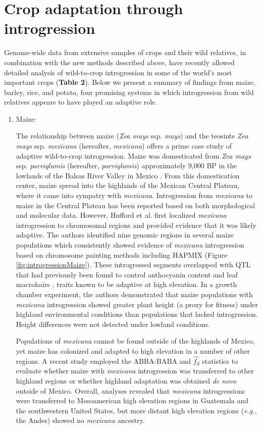 \documentclass[11pt]{article}
\begin{document}
\section*{Crop adaptation through introgression}

Genome-wide data from extensive samples of crops and their wild relatives, in combination with the new methods described above, have recently allowed detailed analysis of wild-to-crop introgression in some of the world's most important crops (\textbf{Table 2}).
Below we present a summary of findings from maize, barley, rice, and potato, four promising systems in which introgression from wild relatives appears to have played an adaptive role.

\begin{enumerate}
\item{Maize:}

The relationship between maize (\emph{Zea mays} ssp. \emph{mays}) and the teosinte \emph{Zea mays} ssp. \emph{mexicana} (hereafter, \emph{mexicana}) offers a prime case study of adaptive wild-to-crop introgression.
Maize was domesticated from \emph{Zea mays} ssp. \emph{parviglumis} (hereafter, \emph{parviglumis})  approximately 9,000 BP in the lowlands of the Balsas River Valley in Mexico \cite{matsuoka2002single}.
From this domestication center, maize spread into the highlands of the Mexican Central Plateau, where it came into sympatry with \emph{mexicana}.
Introgression from \emph{mexicana} to maize in the Central Plateau has been reported based on both morphological \cite {wilkes1977} and molecular \cite{vanHeerwaarden2011, doebley1987} data.
However, Hufford et al. \cite{Hufford2013} first localized \emph{mexicana} introgression to chromosomal regions and provided evidence that it was likely adaptive.
The authors identified nine genomic regions in several maize populations which consistently showed evidence of \emph{mexicana} introgression based on chromosome painting methods including HAPMIX (Figure \ref{fig:introgressionMaize}).
These introgressed segments overlapped with QTL that had previously been found to control anthocyanin content and leaf macrohairs \cite{lauter2004}, traits known to be adaptive at high elevation.
In a growth chamber experiment, the authors demonstrated that maize populations with \emph{mexicana} introgression showed greater plant height (a proxy for fitness) under highland environmental conditions than populations that lacked introgression.
Height differences were not detected under lowland conditions.


Populations of \emph{mexicana} cannot be found outside of the highlands of Mexico, yet maize has colonized and adapted to high elevation in a number of other regions.
A recent study \cite{wang2017} employed the ABBA-BABA and $\hat{f_{d}}$ statistics to evaluate whether maize with \emph{mexicana} introgression was transferred to other highland regions or whether highland adaptation was obtained \emph{de novo} outside of Mexico.
Overall, analyses revealed that  \emph{mexicana} introgressions were transferred to Mesoamerican high elevation regions in Guatemala and the southwestern United States, but more distant high elevation regions (\emph{e.g.,} the Andes) showed no \emph{mexicana} ancestry. 


\end{enumerate}
\end{document}
